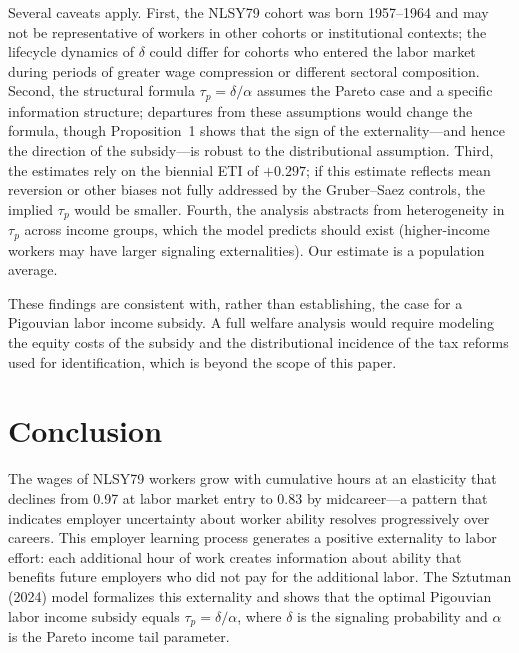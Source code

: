 \documentclass[12pt]{article}
\theoremstyle{definition}
\theoremstyle{remark}
\begin{document}
Several caveats apply. First, the NLSY79 cohort was born 1957--1964 and may not be
representative of workers in other cohorts or institutional contexts; the lifecycle
dynamics of $\delta$ could differ for cohorts who entered the labor market during periods
of greater wage compression or different sectoral composition. Second, the structural
formula $\tau_p = \delta / \alpha$ assumes the Pareto case and a specific information
structure; departures from these assumptions would change the formula, though Proposition~1
shows that the sign of the externality---and hence the direction of the subsidy---is
robust to the distributional assumption. Third, the estimates rely on the biennial ETI
of $+0.297$; if this estimate reflects mean reversion or other biases not fully addressed
by the Gruber--Saez controls, the implied $\tau_p$ would be smaller. Fourth, the analysis
abstracts from heterogeneity in $\tau_p$ across income groups, which the model predicts
should exist (higher-income workers may have larger signaling externalities). Our estimate
is a population average.

These findings are consistent with, rather than establishing, the case for a Pigouvian
labor income subsidy. A full welfare analysis would require modeling the equity costs of
the subsidy and the distributional incidence of the tax reforms used for identification,
which is beyond the scope of this paper.

\section{Conclusion}
\label{sec:conclusion}

The wages of NLSY79 workers grow with cumulative hours at an elasticity that declines from
0.97 at labor market entry to 0.83 by midcareer---a pattern that indicates employer uncertainty
about worker ability resolves progressively over careers. This employer learning process
generates a positive externality to labor effort: each additional hour of work creates
information about ability that benefits future employers who did not pay for the additional
labor. The Sztutman (2024) model formalizes this externality and shows that the optimal
Pigouvian labor income subsidy equals $\tau_p = \delta / \alpha$, where $\delta$ is the
signaling probability and $\alpha$ is the Pareto income tail parameter.
\end{document}
